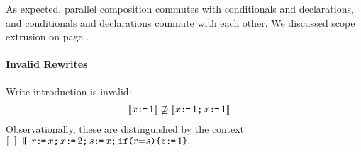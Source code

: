 

As expected, %
parallel composition commutes with conditionals and declarations, and
conditionals and declarations commute with each other.  We discussed scope
extrusion on page \pageref{page:extrusion}.



\paragraph{Invalid Rewrites}

Write introduction is invalid:
\begin{align*}
  \llbracket x \texttt{:}\mkern-1mu\texttt{=}\, 1\rrbracket 
  &\not\supseteq
  \llbracket x \texttt{:}\mkern-1mu\texttt{=}\, 1 \texttt{;}\,\allowbreak x \texttt{:}\mkern-1mu\texttt{=}\, 1\rrbracket
\end{align*}
Observationally, these are distinguished by the context
\begin{math}
  \hole{} \PAR
  r\GETS x \SEMI
  x\GETS2 \SEMI
  s\GETS x\SEMI
  \IF{\aReg {=} \bReg} \THEN \cLoc \GETS 1 \FI.
\end{math}

